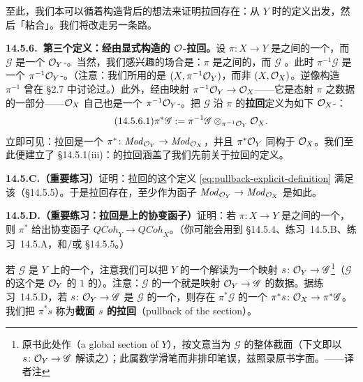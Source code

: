 至此，我们本可以循着\trFiberProduct{}构造背后的想法来证明拉回存在：从 $Y$ \trAffine{}时的定义出发，然后「粘合」。我们将改走另一条路。

\textbf{14.5.6.\ 第三个定义：经由显式构造的 $\mathcal{O}$-\trModule{}拉回。}\quad 设 $\pi\colon X\to Y$ 是\trRingedSpace{}之间的一个\trMorphism，而 $\mathscr{G}$ 是一个 $\mathcal{O}_Y$-\trModule。当然，我们感兴趣的场合是：$\pi$ 是\trScheme{}之间的\trMorphism，而 $\mathscr{G}$ \trQC。此时 $\pi^{-1}\mathscr{G}$ 是一个 $\pi^{-1}\mathcal{O}_Y$-\trModule。（注意：我们所用的是\trRingedSpace{} $(X,\pi^{-1}\mathcal{O}_Y)$，而非 $(X,\mathcal{O}_X)$。逆像构造 $\pi^{-1}$ 曾在 \S2.7 中讨论过。）此外，经由映射 $\pi^{-1}\mathcal{O}_Y\to\mathcal{O}_X$——它是态射 $\pi$ 之数据的一部分——$\mathcal{O}_X$ 自己也是一个 $\pi^{-1}\mathcal{O}_Y$-\trModule。把 $\mathscr{G}$ 沿 $\pi$ 的\textbf{拉回}定义为如下 $\mathcal{O}_X$-\trModule：
\begin{equation*}\tag{14.5.6.1}\label{eq:pullback-explicit-definition}
\pi^*\mathscr{G}:=\pi^{-1}\mathscr{G}\otimes_{\pi^{-1}\mathcal{O}_Y}\mathcal{O}_X.
\end{equation*}
立即可见：拉回是一个\trCovariantFunctor{} $\pi^*\colon\mathit{Mod}_{\mathcal{O}_Y}\to\mathit{Mod}_{\mathcal{O}_X}$，并且 $\pi^*\mathcal{O}_Y$ \trCanonically{}同构于 $\mathcal{O}_X$。我们至此便建立了 \S14.5.1(iii)：\trQCSheaf{}的拉回涵盖了我们先前关于\trLocallyFreeSheaf{}拉回的定义。

\textbf{14.5.C.（重要练习）}\quad 证明：拉回的这个定义 \eqref{eq:pullback-explicit-definition} 满足该\trUniversalProperty（\S14.5.5）。于是拉回存在，至少作为函子 $\mathit{Mod}_{\mathcal{O}_Y}\to\mathit{Mod}_{\mathcal{O}_X}$ 是如此。

\textbf{14.5.D.（重要练习：拉回是\trQCSheaf{}上的协变函子）}\quad 证明：若 $\pi\colon X\to Y$ 是\trScheme{}之间的一个\trMorphism，则 $\pi^*$ 给出协变函子 $\mathit{QCoh}_Y\to\mathit{QCoh}_X$。（你可能会用到 \S14.5.4、\mbox{练习~14.5.B}、\mbox{练习~14.5.A}，和/或 \S14.5.5。）

若 $\mathscr{G}$ 是 $Y$ 上的一个\trQCSheaf，注意我们可以把 $Y$ 的一个\trGlobalSections{}解读为一个映射 $s\colon\mathcal{O}_Y\to\mathscr{G}$\footnote{原书此处作（a global section of $Y$），按文意当为 $\mathscr{G}$ 的整体截面（下文即以 $s\colon\mathcal{O}_Y\to\mathscr{G}$ 解读之）；此属数学滑笔而非排印笔误，兹照录原书字面。——译者注}（$\mathscr{G}$ 的这个\trSection{}是 $\mathcal{O}_Y$ 的\trSection{} $1$ 的\trImage）。注意：$\mathscr{G}$ 的一个\trSection{}就是映射 $\mathcal{O}_Y\to\mathscr{G}$ 的数据。据\mbox{练习~14.5.D}，若 $s\colon\mathcal{O}_Y\to\mathscr{G}$ 是 $\mathscr{G}$ 的一个\trSection，则存在 $\pi^*\mathscr{G}$ 的一个\trNatural{}\trSection{} $\pi^*s\colon\mathcal{O}_X\to\pi^*\mathscr{G}$。我们把 $\pi^*s$ 称为\textbf{截面 $s$ 的拉回}（pullback of the section）。

